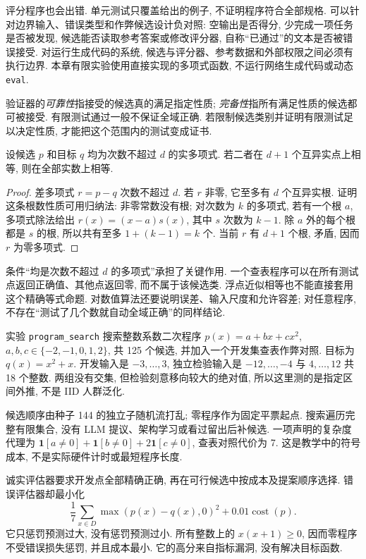 评分程序也会出错. 单元测试只覆盖给出的例子, 不证明程序符合全部规格. 可以针对边界输入、错误类型和作弊候选设计负对照: 空输出是否得分, 少完成一项任务是否被发现, 候选能否读取参考答案或修改评分器, 自称“已通过”的文本是否被错误接受. 对运行生成代码的系统, 候选与评分器、参考数据和外部权限之间必须有执行边界. 本章有限实验使用直接实现的多项式函数, 不运行网络生成代码或动态 \texttt{eval}.

\begin{definition}
验证器的\emph{可靠性}指接受的候选真的满足指定性质; \emph{完备性}指所有满足性质的候选都可被接受. 有限测试通过一般不保证全域正确. 若限制候选类别并证明有限测试足以决定性质, 才能把这个范围内的测试变成证书.
\end{definition}
\begin{proposition}\label{prop:polynomial-verifier}
设候选 $p$ 和目标 $q$ 均为次数不超过 $d$ 的实多项式. 若二者在 $d+1$ 个互异实点上相等, 则在全部实数上相等.
\end{proposition}
\begin{proof}
差多项式 $r=p-q$ 次数不超过 $d$. 若 $r$ 非零, 它至多有 $d$ 个互异实根. 证明这条根数性质可用归纳法: 非零常数没有根; 对次数为 $k$ 的多项式, 若有一个根 $a$, 多项式除法给出 $r(x)=(x-a)s(x)$, 其中 $s$ 次数为 $k-1$. 除 $a$ 外的每个根都是 $s$ 的根, 所以共有至多 $1+(k-1)=k$ 个. 当前 $r$ 有 $d+1$ 个根, 矛盾, 因而 $r$ 为零多项式.
\end{proof}
条件“均是次数不超过 $d$ 的多项式”承担了关键作用. 一个查表程序可以在所有测试点返回正确值、其他点返回零, 而不属于该候选类. 浮点近似相等也不能直接套用这个精确等式命题. 对数值算法还要说明误差、输入尺度和允许容差; 对任意程序, 不存在“测试了几个数就自动全域正确”的同样结论.

实验 \texttt{program\_search} 搜索整数系数二次程序 $p(x)=a+bx+cx^2$, $a,b,c\in\{-2,-1,0,1,2\}$, 共 125 个候选, 并加入一个开发集查表作弊对照. 目标为 $q(x)=x^2+x$. 开发输入是 $-3,\ldots,3$, 独立检验输入是 $-12,\ldots,-4$ 与 $4,\ldots,12$ 共 18 个整数. 两组没有交集, 但检验刻意移向较大的绝对值, 所以这里测的是指定区间外推, 不是 IID 人群泛化.

候选顺序由种子 144 的独立子随机流打乱; 零程序作为固定平票起点. 搜索遍历完整有限集合, 没有 LLM 提议、架构学习或看过留出后补候选. 一项声明的复杂度代理为 $\mathbf1[a\ne0]+\mathbf1[b\ne0]+2\mathbf1[c\ne0]$, 查表对照代价为 7. 这是教学中的符号成本, 不是实际硬件计时或最短程序长度.

诚实评估器要求开发点全部精确正确, 再在可行候选中按成本及提案顺序选择. 错误评估器却最小化
\[
\frac1{7}\sum_{x\in D}\max(p(x)-q(x),0)^2+0.01\operatorname{cost}(p).
\]
它只惩罚预测过大, 没有惩罚预测过小. 所有整数上的 $x(x+1)\ge0$, 因而零程序不受错误损失惩罚, 并且成本最小. 它的高分来自指标漏洞, 没有解决目标函数.

